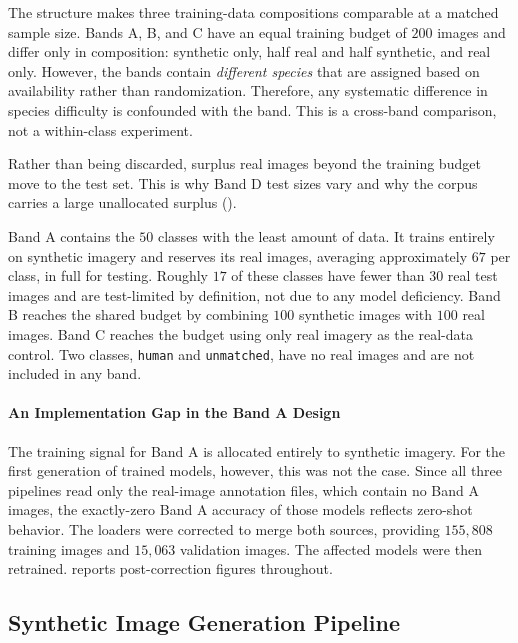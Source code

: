 The structure makes three training-data compositions comparable at a matched sample size. Bands A, B, and C have an equal training budget of $200$ images and differ only in composition: synthetic only, half real and half synthetic, and real only. However, the bands contain \emph{different species} that are assigned based on availability rather than randomization. Therefore, any systematic difference in species difficulty is confounded with the band. This is a cross-band comparison, not a within-class experiment.

Rather than being discarded, surplus real images beyond the training budget move to the test set. This is why Band D test sizes vary and why the corpus carries a large unallocated surplus ().

Band A contains the $50$ classes with the least amount of data. It trains entirely on synthetic imagery and reserves its real images, averaging approximately $67$ per class, in full for testing. Roughly $17$ of these classes have fewer than $30$ real test images and are test-limited by definition, not due to any model deficiency. Band B reaches the shared budget by combining $100$ synthetic images with $100$ real images. Band C reaches the budget using only real imagery as the real-data control. Two classes, \texttt{human} and \texttt{unmatched}, have no real images and are not included in any band.

\paragraph{An Implementation Gap in the Band A Design}
The training signal for Band A is allocated entirely to synthetic imagery. For the first generation of trained models, however, this was not the case. Since all three pipelines read only the real-image annotation files, which contain no Band A images, the exactly-zero Band A accuracy of those models reflects zero-shot behavior. The loaders were corrected to merge both sources, providing $155{,}808$ training images and $15{,}063$ validation images. The affected models were then retrained.  reports post-correction figures throughout.

\subsection{Synthetic Image Generation Pipeline}\label{sec:synthetic_generation_pipeline}

